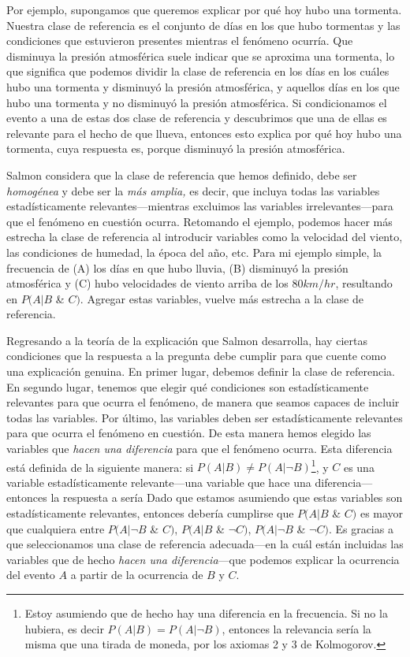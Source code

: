 Por ejemplo, supongamos que queremos explicar por qué hoy
hubo una tormenta. Nuestra clase de referencia es el
conjunto de días en los que hubo tormentas y las condiciones
que estuvieron presentes mientras el fenómeno ocurría. Que
disminuya la presión atmosférica suele indicar que se
aproxima una tormenta, lo que significa que podemos dividir
la clase de referencia en los días en los cuáles hubo una
tormenta y disminuyó la presión atmosférica, y aquellos días
en los que hubo una tormenta y no disminuyó la presión
atmosférica. Si condicionamos el evento a una de estas dos
clase de referencia y descubrimos que una de ellas es
relevante para el hecho de que llueva, entonces esto explica
por qué hoy hubo una tormenta, cuya respuesta es, porque
disminuyó la presión atmosférica.

Salmon considera que la clase de referencia que hemos
definido, debe ser \emph{homogénea} y debe ser la \emph{más
amplia,} es decir, que incluya todas las variables
estadísticamente relevantes---mientras excluimos las
variables irrelevantes---para que el fenómeno en cuestión
ocurra. Retomando el ejemplo, podemos hacer más estrecha la
clase de referencia al introducir variables como la
velocidad del viento, las condiciones de humedad, la época
del año, etc. Para mi ejemplo simple, la frecuencia de (A)
los días en que hubo lluvia, (B) disminuyó la presión
atmosférica y (C) hubo velocidades de viento arriba de los $
80km/hr $, resultando en $ P( A | B$ \& $ C ) $. Agregar
estas variables, vuelve más estrecha a la clase de
referencia.

Regresando a la teoría de la explicación que Salmon
desarrolla, hay ciertas condiciones que la respuesta a la
pregunta  debe cumplir para que
cuente como una explicación genuina. En primer lugar,
debemos definir la clase de referencia. En segundo lugar,
tenemos que elegir qué condiciones son estadísticamente
relevantes para que ocurra el fenómeno, de manera que seamos
capaces de incluir todas las variables. Por último, las
variables deben ser estadísticamente relevantes para que
ocurra el
fenómeno en cuestión. De esta manera hemos elegido las
variables que \emph{hacen una diferencia} para que el
fenómeno ocurra. Esta diferencia está definida de la
siguiente manera: si $ P( A | B ) \neq P( A | \neg{ B } )
$\footnote{
  Estoy asumiendo que de hecho hay una diferencia en la
  frecuencia. Si no la hubiera, es decir $ P( A | B ) = P( A
  | \neg{ B } ) $, entonces la relevancia sería la misma que
  una tirada de moneda, por los axiomas 2 y	3 de Kolmogorov. 
},
y $C$ es una variable estadísticamente relevante---una
variable que hace una diferencia---entonces la respuesta a
 sería  Dado que estamos asumiendo que estas variables son
estadísticamente relevantes, entonces debería cumplirse que
$ P( A | B$ \& $C )$ es mayor que cualquiera entre $ P( A |
\neg{ B }$ \& $C ) $, $ P( A | B$ \& $\neg{ C } ) $, $ P( A
| \neg{ B }$ \& $\neg{ C } ) $. Es gracias a que
seleccionamos una clase de referencia adecuada---en la cuál
están incluidas las variables que de hecho \emph{hacen una
diferencia}---que podemos explicar la ocurrencia del evento
$ A $ a partir de la ocurrencia de $ B $ y $ C $.

